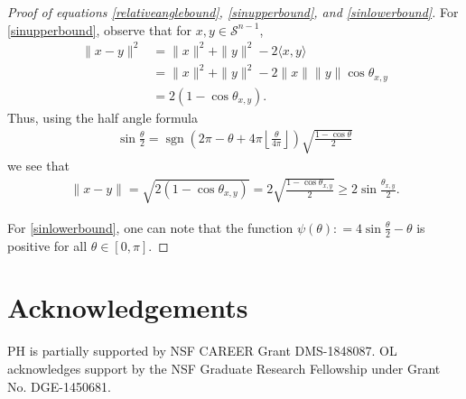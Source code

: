 \documentclass[11pt]{article}
\newcommand{\sgn}{\operatorname{sgn}}
\newcommand{\Seps}{\mathcal{S}}
\theoremstyle{remark}
\begin{document}
\begin{proof}[Proof of equations \eqref{relativeanglebound}, \eqref{sinupperbound}, and \eqref{sinlowerbound}]
For \eqref{sinupperbound}, observe that for $x,y \in \Seps^{n-1}$, \begin{align*}
    \|x-y\|^2 & = \|x\|^2 + \|y\|^2 - 2 \langle x,y \rangle \\
    & = \|x\|^2 + \|y\|^2 - 2\|x\|\|y\|\cos\theta_{x,y} \\
    & = 2(1 - \cos \theta_{x,y}).
\end{align*} Thus, using the half angle formula \begin{align*}
    \sin \frac{\theta}{2} = \sgn\left(2\pi - \theta + 4\pi \left\lfloor \frac{\theta}{4\pi}\right\rfloor\right)\sqrt{\frac{1 - \cos \theta}{2}}
\end{align*} we see that \begin{align*}
    \|x-y\| = \sqrt{2(1- \cos\theta_{x,y})} = 2\sqrt{\frac{1 - \cos \theta_{x,y}}{2}} \geqslant 2\sin\frac{\theta_{x,y}}{2}.
\end{align*} 

For \eqref{sinlowerbound}, one can note that the function $\psi(\theta) : = 4\sin\frac{\theta}{2} - \theta$ is positive for all $\theta \in [0,\pi].$ 
\end{proof}

 \section*{Acknowledgements}
  PH is partially supported by NSF CAREER Grant DMS-1848087. OL acknowledges support by the NSF Graduate Research Fellowship under Grant No. DGE-1450681.




\end{document}
